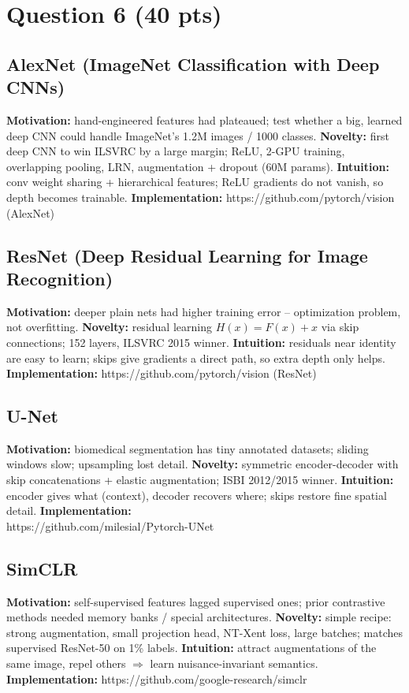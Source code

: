 \documentclass[11pt,a4paper]{article}
\begin{document}
\section{Question 6 (40 pts)}

\subsection{AlexNet (ImageNet Classification with Deep CNNs)}
\textbf{Motivation:} hand-engineered features had plateaued; test whether a big,
learned deep CNN could handle ImageNet's 1.2M images / 1000 classes.
\textbf{Novelty:} first deep CNN to win ILSVRC by a large margin; ReLU, 2-GPU
training, overlapping pooling, LRN, augmentation + dropout (60M params).
\textbf{Intuition:} conv weight sharing + hierarchical features; ReLU gradients do
not vanish, so depth becomes trainable.
\textbf{Implementation:} https://github.com/pytorch/vision (AlexNet)

\subsection{ResNet (Deep Residual Learning for Image Recognition)}
\textbf{Motivation:} deeper plain nets had higher training error -- optimization
problem, not overfitting.
\textbf{Novelty:} residual learning $H(x)=F(x)+x$ via skip connections; 152 layers,
ILSVRC 2015 winner.
\textbf{Intuition:} residuals near identity are easy to learn; skips give gradients
a direct path, so extra depth only helps.
\textbf{Implementation:} https://github.com/pytorch/vision (ResNet)

\subsection{U-Net}
\textbf{Motivation:} biomedical segmentation has tiny annotated datasets; sliding
windows slow; upsampling lost detail.
\textbf{Novelty:} symmetric encoder-decoder with skip concatenations + elastic
augmentation; ISBI 2012/2015 winner.
\textbf{Intuition:} encoder gives what (context), decoder recovers where; skips
restore fine spatial detail.
\textbf{Implementation:}\\
https://github.com/milesial/Pytorch-UNet

\subsection{SimCLR}
\textbf{Motivation:} self-supervised features lagged supervised ones; prior
contrastive methods needed memory banks / special architectures.
\textbf{Novelty:} simple recipe: strong augmentation, small projection head,
NT-Xent loss, large batches; matches supervised ResNet-50 on 1\% labels.
\textbf{Intuition:} attract augmentations of the same image, repel others
$\Rightarrow$ learn nuisance-invariant semantics.
\textbf{Implementation:} https://github.com/google-research/simclr
\end{document}

